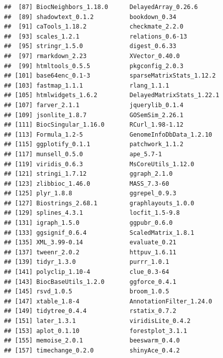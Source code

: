 \documentclass[
  11pt,
]{article}
\begin{document}
\begin{verbatim}
##  [87] BiocNeighbors_1.18.0      DelayedArray_0.26.6      
##  [89] shadowtext_0.1.2          bookdown_0.34            
##  [91] caTools_1.18.2            checkmate_2.2.0          
##  [93] scales_1.2.1              relations_0.6-13         
##  [95] stringr_1.5.0             digest_0.6.33            
##  [97] rmarkdown_2.23            XVector_0.40.0           
##  [99] htmltools_0.5.5           pkgconfig_2.0.3          
## [101] base64enc_0.1-3           sparseMatrixStats_1.12.2 
## [103] fastmap_1.1.1             rlang_1.1.1              
## [105] htmlwidgets_1.6.2         DelayedMatrixStats_1.22.1
## [107] farver_2.1.1              jquerylib_0.1.4          
## [109] jsonlite_1.8.7            GOSemSim_2.26.1          
## [111] BiocSingular_1.16.0       RCurl_1.98-1.12          
## [113] Formula_1.2-5             GenomeInfoDbData_1.2.10  
## [115] ggplotify_0.1.1           patchwork_1.1.2          
## [117] munsell_0.5.0             ape_5.7-1                
## [119] viridis_0.6.3             MsCoreUtils_1.12.0       
## [121] stringi_1.7.12            ggraph_2.1.0             
## [123] zlibbioc_1.46.0           MASS_7.3-60              
## [125] plyr_1.8.8                ggrepel_0.9.3            
## [127] Biostrings_2.68.1         graphlayouts_1.0.0       
## [129] splines_4.3.1             locfit_1.5-9.8           
## [131] igraph_1.5.0              ggpubr_0.6.0             
## [133] ggsignif_0.6.4            ScaledMatrix_1.8.1       
## [135] XML_3.99-0.14             evaluate_0.21            
## [137] tweenr_2.0.2              httpuv_1.6.11            
## [139] tidyr_1.3.0               purrr_1.0.1              
## [141] polyclip_1.10-4           clue_0.3-64              
## [143] BiocBaseUtils_1.2.0       ggforce_0.4.1            
## [145] rsvd_1.0.5                broom_1.0.5              
## [147] xtable_1.8-4              AnnotationFilter_1.24.0  
## [149] tidytree_0.4.4            rstatix_0.7.2            
## [151] later_1.3.1               viridisLite_0.4.2        
## [153] aplot_0.1.10              forestplot_3.1.1         
## [155] memoise_2.0.1             beeswarm_0.4.0           
## [157] timechange_0.2.0          shinyAce_0.4.2
\end{verbatim}

\newpage
\listoffigures
\end{document}
